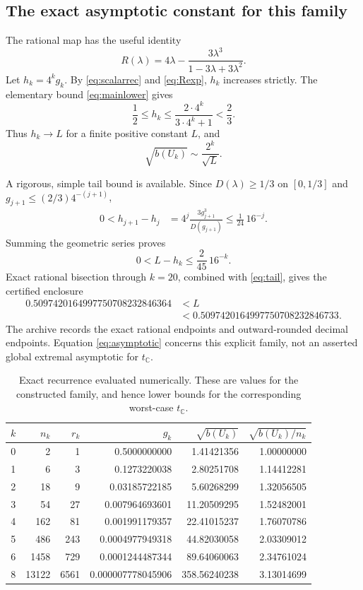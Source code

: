 \documentclass[11pt,letterpaper]{article}
\theoremstyle{definition}
\theoremstyle{remark}
\newcommand{\C}{\mathbb C}
\begin{document}
\subsection{The exact asymptotic constant for this family}

The rational map has the useful identity
\begin{equation}
 R(\lambda)=4\lambda-\frac{3\lambda^3}{1-3\lambda+3\lambda^2}.
 \label{eq:Rexp}
\end{equation}
Let $h_k=4^kg_k$. By \eqref{eq:scalarrec} and \eqref{eq:Rexp}, $h_k$ increases strictly. The elementary bound \eqref{eq:mainlower} gives
\[
 \frac12\le h_k\le\frac{2\cdot4^k}{3\cdot4^k+1}<\frac23.
\]
Thus $h_k\to L$ for a finite positive constant $L$, and
\begin{equation}
 \sqrt{b(U_k)}\sim \frac{2^k}{\sqrt L}.
 \label{eq:asymptotic}
\end{equation}

A rigorous, simple tail bound is available. Since $D(\lambda)\ge1/3$ on $[0,1/3]$ and $g_{j+1}\le(2/3)4^{-(j+1)}$,
\begin{align*}
 0<h_{j+1}-h_j
 &=4^j\frac{3g_{j+1}^3}{D(g_{j+1})}
 \le\frac1{24}\,16^{-j}.
\end{align*}
Summing the geometric series proves
\begin{equation}
 0<L-h_k\le\frac2{45}\,16^{-k}.
 \label{eq:tail}
\end{equation}
Exact rational bisection through $k=20$, combined with \eqref{eq:tail}, gives the certified enclosure
\begin{align*}
 0.5097420164997750708232846364
 &<L\\
 &<0.5097420164997750708232846733.
\end{align*}
The archive records the exact rational endpoints and outward-rounded decimal endpoints. Equation \eqref{eq:asymptotic} concerns this explicit family, not an asserted global extremal asymptotic for $t_\C$.

\begin{table}[ht]
\centering
\caption{Exact recurrence evaluated numerically. These are values for the constructed family, and hence lower bounds for the corresponding worst-case $t_\C$.}
\begin{tabular}{rrrrrr}
\toprule
$k$&$n_k$&$r_k$&$g_k$&$\sqrt{b(U_k)}$&$\sqrt{b(U_k)/n_k}$\\
\midrule
0&2&1&0.5000000000&1.41421356&1.00000000\\
1&6&3&0.1273220038&2.80251708&1.14412281\\
2&18&9&0.03185722185&5.60268299&1.32056505\\
3&54&27&0.007964693601&11.20509295&1.52482001\\
4&162&81&0.001991179357&22.41015237&1.76070786\\
5&486&243&0.0004977949318&44.82030058&2.03309012\\
6&1458&729&0.0001244487344&89.64060063&2.34761024\\
8&13122&6561&0.000007778045906&358.56240238&3.13014699\\
\bottomrule
\end{tabular}
\label{tab:values}
\end{table}
\end{document}
